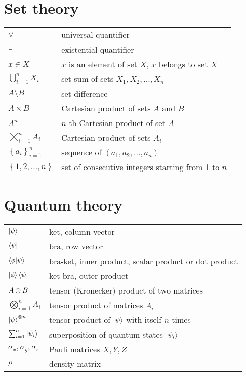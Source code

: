 \documentclass[../main.tex]{subfiles}
\begin{document}
\section*{Set theory}
\hspace*{-0.275cm}
\begin{tabular}{p{2.2cm}l}
    $\forall$ & universal quantifier \\
    $\exists$ & existential quantifier \\
    $x \in X$ & $x$ is an element of set $X$, $x$ belongs to set $X$ \\
    $\bigcup_{i=1}^n X_i$ & set sum of sets $X_1, X_2, \ldots, X_n$ \\
    $A \setminus B$ & set difference \\
    $A \times B$ & Cartesian product of sets $A$ and $B$ \\
    $A^n$ & $n$-th Cartesian product of set $A$ \\
    $\bigtimes_{i=1}^n A_i$ & Cartesian product of sets $A_i$ \\
    $\left\{a_i\right\}_{i=1}^n$ & sequence of $\left(a_1, a_2, \ldots, a_n\right)$ \\
    $\left\{1, 2, \ldots, n\right\}$ & set of consecutive integers starting from 1 to $n$ \\
\end{tabular}

\section*{Quantum theory}
\hspace*{-0.275cm}
\begin{tabular}{p{2.2cm}l}
    $\ket{\psi}$ & ket, column vector \\
    $\bra{\psi}$ & bra, row vector \\
    $\braket{\phi|\psi}$ & bra-ket, inner product, scalar product or dot product \\
    $\ket{\phi} \bra{\psi}$ & ket-bra, outer product \\
    $A \otimes B$ & tensor (Kronecker) product of two matrices \\
    $\bigotimes_{i=1}^n A_i$ & tensor product of matrices $A_i$ \\
    $\ket{\psi}^{\otimes n}$ & tensor product of $\ket{\psi}$ with itself $n$ times \\
    $\sum_{i=1}^n \ket{\psi_i}$ & superposition of quantum states $\ket{\psi_i}$ \\
    $\sigma_x, \sigma_y, \sigma_z$ & Pauli matrices $X, Y, Z$ \\
    $\rho$ & density matrix \\
\end{tabular}
\end{document}

